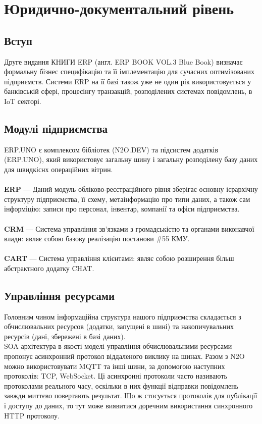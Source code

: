 \chapter{Юридично-документальний рівень}

\section{Вступ}

Друге видання КНИГИ ERP (англ. ERP BOOK VOL.3 Blue Book) визначає формальну
бізнес специфікацію та її імплементацію для сучасних оптимізованих підприємств.
Системи ERP на її базі також уже не один рік використовується у банківській сфері,
процесінгу транзакцій, розподілених системах повідомлень, в IoT секторі.

\section{Модулі підприємства}

ERP.UNO є комплексом бібліотек (N2O.DEV) та підсистем додатків (ERP.UNO),
який використовує загальну шину і загальну розподілену базу даних для швидкіснх операційних вітрин.
\\
\\
\textbf{ERP} — Даний модуль обліково-реєстраційного рівня зберігає основну ієрархічну структуру
        підприємства, її схему, метаінформацію про типи даних, а також сам інформіцію:
        записи про персонал, інвентар, компанії та офіси підприємства.
\\
\\
\textbf{CRM} — Система управління зв'язками з громадськістю та органами виконавчої влади:
        являє собою базову реалізацію постанови \#55 КМУ.
\\
\\
\textbf{CART} — Система управління клієнтами: являє собою розширення більш
           абстрактного додатку CHAT.

\section{Управління ресурсами}

Головним чином інформаційна структура нашого підприємства
складається з обчислювальних ресурсов (додатки, запущені в шині)
та накопичувальних ресурсів (дані, збережені в базі даних).
\
\\
SOA архітектура в якості моделі управління обчислювальними
ресурсами пропонує асинхронний протокол віддаленого виклику на шинах.
Разом з N2O можно використовувати MQTT та інші шини, за допомогою наступних протоколів: TCP, WebSocket.
Ці асинхронні протоколи часто називають
протоколами реального часу, оскільки в них функції відправки повідомлень завжди
миттєво повертають результат. Що ж стосується протоколів для публікації і доступу
до даних, то тут може виявитися доречним використання синхронного HTTP протоколу.


